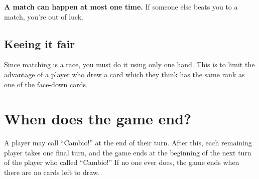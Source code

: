\documentclass[12pt]{article}
\begin{document}
\textbf{A match can happen at most one time.} If someone else beats you to a match, you're out of luck.
\subsection*{Keeing it fair}
Since matching is a race, you must do it using only one hand.
This is to limit the advantage of a player who drew a card which they think has the same rank as one of the face-down cards.

\section{When does the game end?}
A player may call ``Cambio!'' at the end of their turn. After this, each remaining player takes one final turn, and the game ends at the beginning of the next turn of the player who called ``Cambio!'' If no one ever does, the game ends when there are no cards left to draw.
\end{document}
